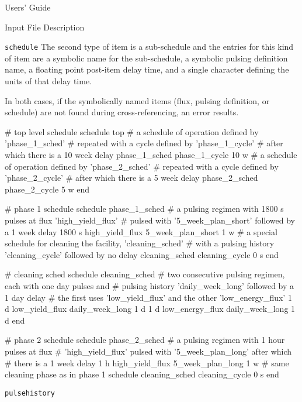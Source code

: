 \begin{chapter}{Users' Guide\label{app:user.guide}}
\begin{section}{Input File Description\label{app:user.input}}
\begin{subsection}{\texttt{schedule}\label{app:user.input.sched}}
      The second type of item is a sub-schedule and the entries for
      this kind of item are a symbolic name for the sub-schedule, a
      symbolic pulsing definition name, a floating point post-item delay
      time, and a single character defining the units of that delay
      time.
      
      In both cases, if the symbolically named items (flux, pulsing
      definition, or schedule) are not found during cross-referencing,
      an error results.

      \begin{center}
        \renewcommand{\baselinestretch}{1}\normalsize
        \begin{boxedverbatim}
# top level schedule
schedule top
    # a schedule of operation defined by 'phase_1_sched' 
    #     repeated with a cycle defined by 'phase_1_cycle'
    #     after which there is a 10 week delay
  phase_1_sched phase_1_cycle 10 w
    # a schedule of operation defined by 'phase_2_sched' 
    #     repeated with a cycle defined by 'phase_2_cycle'
    #     after which there is a 5 week delay
  phase_2_sched phase_2_cycle 5 w
end

# phase 1 schedule
schedule phase_1_sched
    # a pulsing regimen with 1800 s pulses at flux 'high_yield_flux' 
    # pulsed with '5_week_plan_short' followed by a 1 week delay
  1800 s high_yield_flux 5_week_plan_short 1 w
    # a special schedule for cleaning the facility, 'cleaning_sched'
    # with a pulsing history 'cleaning_cycle' followed by no delay
  cleaning_sched cleaning_cycle 0 s
end

# cleaning sched
schedule cleaning_sched
    # two consecutive pulsing regimen, each with one day pulses and
    # pulsing history 'daily_week_long' followed by a 1 day delay
    # the first uses 'low_yield_flux' and the other 'low_energy_flux'
  1 d low_yield_flux daily_week_long 1 d
  1 d low_energy_flux daily_week_long 1 d
end

# phase 2 schedule
schedule phase_2_sched
    # a pulsing regimen with 1 hour pulses at flux 
    # 'high_yield_flux' pulsed with '5_week_plan_long' after which
    # there is a 1 week delay
  1 h high_yield_flux 5_week_plan_long 1 w
    # same cleaning phase as in phase 1 schedule
  cleaning_sched cleaning_cycle 0 s
end
\end{boxedverbatim}
      \end{center}

    \end{subsection}

    \begin{subsection}{\texttt{pulsehistory}\label{app:user.input.pulse}}
      

\end{subsection}
\end{section}
\end{chapter}
